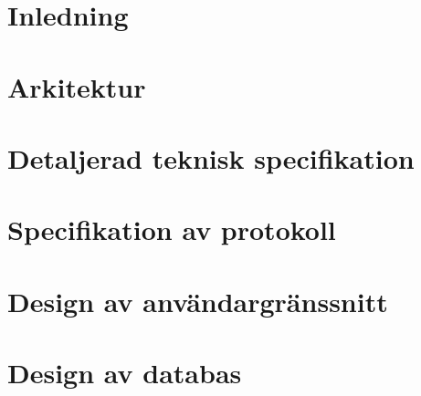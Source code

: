 \pagestyle{plain}
\setcounter{page}{1}

\chapter{Inledning}\label{cha:inledning}


\chapter{Arkitektur}\label{cha:arkitektur}


\chapter{Detaljerad teknisk specifikation}\label{cha:tekspec}


\chapter{Specifikation av protokoll}\label{cha:protokoll}


\chapter{Design av användargränssnitt}\label{cha:gui}


\chapter{Design av databas}\label{cha:databas}


%
